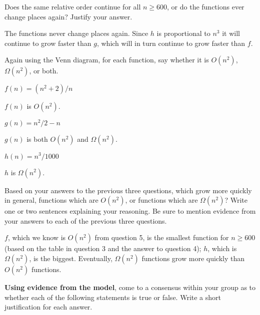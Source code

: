 \documentclass{tufte-handout}
\begin{document}
\begin{questions}
\item Does the same relative order continue for all $n \geq 600$, or do
  the functions ever change places again?  Justify your answer.
  \begin{answer}The functions never change places again.  Since $h$
    is proportional to $n^3$ it will continue to grow faster than
    $g$, which will in turn continue to grow faster than
    $f$.\end{answer}
\item \label{q:fgh} Again using the Venn diagram, for each function, say whether it is
  $O(n^2)$, $\Omega(n^2)$, or both.
  \begin{subquestions}
  \item $f(n) = (n^2 + 2)/n$
    \begin{answer}
      $f(n)$ is $O(n^2)$.
    \end{answer}
  \item $g(n) = n^2/2 - n$
    \begin{answer}
      $g(n)$ is both $O(n^2)$ and $\Omega(n^2)$.
    \end{answer}
  \item $h(n) = n^3/1000$
    \begin{answer}
      $h$ is $\Omega(n^2)$.
    \end{answer}
  \end{subquestions}
\item \label{q:synthesize} Based on your answers to the previous three
  questions, which grow more quickly in general, functions which are
  $O(n^2)$, or functions which are $\Omega(n^2)$? Write one or two
  sentences explaining your reasoning.  Be sure to mention evidence
  from your answers to each of the previous three questions.

  \begin{answer}
    $f$, which we know is $O(n^2)$ from question 5, is the smallest
    function for $n \geq 600$ (based on the table in question 3 and
    the answer to question 4); $h$, which is $\Omega(n^2)$, is the
    biggest.  Eventually, $\Omega(n^2)$ functions grow more quickly
    than $O(n^2)$ functions.
  \end{answer}
\end{questions}

\newpage
\noindent \textbf{Using evidence from the model}, come to a consensus
within your group as to whether each of the following statements is
true or false.  Write a short justification for each answer.
\end{document}
